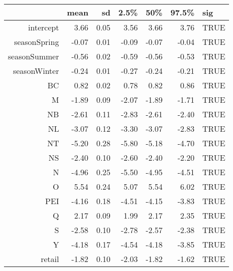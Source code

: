 \begin{table}[ht]
\centering
\begin{tabular}{rrrrrrl}
  \hline
 & mean & sd & 2.5\% & 50\% & 97.5\% & sig \\ 
  \hline
intercept & 3.66 & 0.05 & 3.56 & 3.66 & 3.76 & TRUE \\ 
  seasonSpring & -0.07 & 0.01 & -0.09 & -0.07 & -0.04 & TRUE \\ 
  seasonSummer & -0.56 & 0.02 & -0.59 & -0.56 & -0.53 & TRUE \\ 
  seasonWinter & -0.24 & 0.01 & -0.27 & -0.24 & -0.21 & TRUE \\ 
  BC & 0.82 & 0.02 & 0.78 & 0.82 & 0.86 & TRUE \\ 
  M & -1.89 & 0.09 & -2.07 & -1.89 & -1.71 & TRUE \\ 
  NB & -2.61 & 0.11 & -2.83 & -2.61 & -2.40 & TRUE \\ 
  NL & -3.07 & 0.12 & -3.30 & -3.07 & -2.83 & TRUE \\ 
  NT & -5.20 & 0.28 & -5.80 & -5.18 & -4.70 & TRUE \\ 
  NS & -2.40 & 0.10 & -2.60 & -2.40 & -2.20 & TRUE \\ 
  N & -4.96 & 0.25 & -5.50 & -4.95 & -4.51 & TRUE \\ 
  O & 5.54 & 0.24 & 5.07 & 5.54 & 6.02 & TRUE \\ 
  PEI & -4.16 & 0.18 & -4.51 & -4.15 & -3.83 & TRUE \\ 
  Q & 2.17 & 0.09 & 1.99 & 2.17 & 2.35 & TRUE \\ 
  S & -2.58 & 0.10 & -2.78 & -2.57 & -2.38 & TRUE \\ 
  Y & -4.18 & 0.17 & -4.54 & -4.18 & -3.85 & TRUE \\ 
  retail & -1.82 & 0.10 & -2.03 & -1.82 & -1.62 & TRUE \\ 
   \hline
\end{tabular}
\end{table}
